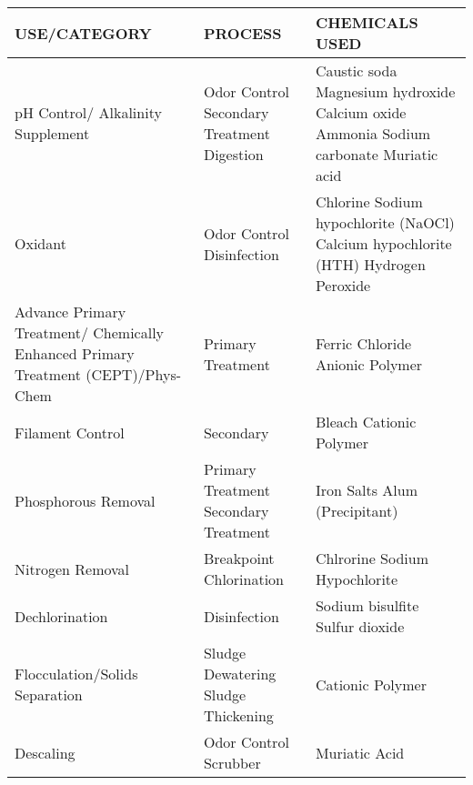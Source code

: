 \begin{tabular}{ |p{5.5cm}|p{4.5cm}|p{5cm}|  }
\hspace{0.5cm}USE/CATEGORY & \hspace{1.2 cm} PROCESS & \hspace{1.2 cm} CHEMICALS USED \\
\hline
pH Control/ \newline Alkalinity Supplement & Odor Control \newline Secondary Treatment \newline Digestion & Caustic soda \newline Magnesium hydroxide \newline Calcium oxide \newline Ammonia \newline Sodium carbonate \newline Muriatic acid\\
\hline
Oxidant & Odor Control \newline Disinfection & Chlorine \newline Sodium hypochlorite (NaOCl) \newline Calcium hypochlorite (HTH) \newline Hydrogen Peroxide\\
\hline
Advance Primary Treatment/ \newline Chemically Enhanced Primary Treatment (CEPT)/Phys-Chem & Primary Treatment & Ferric Chloride \newline Anionic Polymer\\
\hline
Filament Control & Secondary  & Bleach \newline Cationic Polymer\\
\hline
Phosphorous Removal  & Primary Treatment \newline Secondary Treatment & Iron Salts \newline Alum (Precipitant)\\
\hline
Nitrogen Removal  & Breakpoint Chlorination & Chlrorine \newline Sodium Hypochlorite\\
Dechlorination  & Disinfection & Sodium bisulfite  \newline Sulfur dioxide   \\
\hline
Flocculation/Solids Separation & Sludge Dewatering \newline Sludge Thickening & Cationic Polymer \\
\hline
Descaling & Odor Control Scrubber & Muriatic Acid \\
\hline
\end{tabular}

